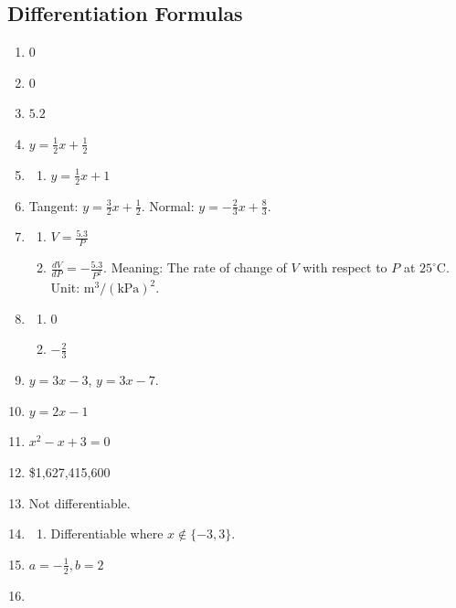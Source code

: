 \documentclass{article}
\begin{document}
\subsection{Differentiation Formulas}
\begin{enumerate}
  \item 0
  \item 0
  \item $5.2$
    \setcounter{enumi}{50}
  \item $y=\frac{1}{2}x+\frac{1}{2}$
    \setcounter{enumi}{52}
  \item
    \begin{enumerate}
      \item $y=\frac{1}{2}x+1$
    \end{enumerate}
    \setcounter{enumi}{54}
  \item Tangent: $y=\frac{3}{2}x+\frac{1}{2}$. Normal: $y=-\frac{2}{3}x+\frac{8}{3}$.
    \setcounter{enumi}{66}
  \item
    \begin{enumerate}
      \item $V=\frac{5.3}{P}$
      \item $\frac{dV}{dP}=-\frac{5.3}{P^2}$. Meaning: The rate of change of $V$ with respect to $P$
        at $25^\circ\text{C}$. Unit: $\text{m}^3/(\text{kPa})^2$.
    \end{enumerate}
    \setcounter{enumi}{72}
  \item
    \begin{enumerate}
      \item 0
      \item $-\frac{2}{3}$
    \end{enumerate}
    \setcounter{enumi}{80}
  \item $y=3x-3$, $y=3x-7$.
    \setcounter{enumi}{82}
  \item $y=2x-1$
    \setcounter{enumi}{88}
  \item $x^2-x+3=0$
    \setcounter{enumi}{92}
  \item \$1,627,415,600
    \setcounter{enumi}{96}
  \item Not differentiable.
    \setcounter{enumi}{98}
  \item
    \begin{enumerate}
      \item Differentiable where $x\notin\{-3, 3\}$.
    \end{enumerate}
    \setcounter{enumi}{100}
  \item $a=-\frac{1}{2}, b=2$
  \item

\end{enumerate}
\end{document}
